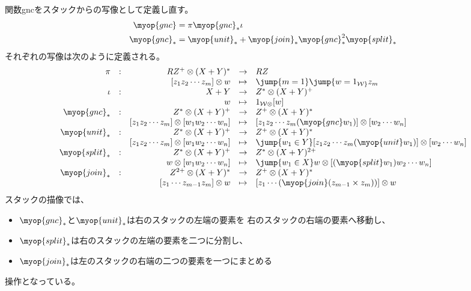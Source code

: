 	関数gncをスタックからの写像として定義し直す。
	\begin{equation}\label{eq:gncのスタックによる表現}\begin{split} %
		\myop{gnc} &= \pi \myop{gnc}_* \iota \\
		\myop{gnc}_* &= \myop{unit}_* 
			+ \myop{join}_*\myop{gnc}_*^2\myop{split}_* \\
	\end{split}\end{equation} %
	それぞれの写像は次のように定義される。
	\begin{equation*}\begin{array}{rcrcl} %
		\pi &:& RZ^+\otimes (X+Y)^* &\to& RZ \\
			&& \word{z_1z_2\cdots z_m}\otimes w &\mapsto&
			\jump{m=1}\jump{w=\wordu}z_m \\
		\iota &:& X+Y &\to& Z^*\otimes (X+Y)^+ \\
			&& w &\mapsto& \wordu\otimes\word{w} \\
		\myop{gnc}_* &:& Z^*\otimes (X+Y)^+ &\to& Z^+\otimes (X+Y)^* \\
			&& \word{z_1z_2\cdots z_m}\otimes\word{w_1w_2\cdots w_n} &\mapsto& 
			\word{z_1z_2\cdots z_m(\myop{gnc}w_1)}\otimes\word{w_2\cdots w_n} \\
		\myop{unit}_* &:& Z^*\otimes (X+Y)^+ &\to& Z^+\otimes (X+Y)^* \\
			&& \word{z_1z_2\cdots z_m}\otimes\word{w_1w_2\cdots w_n} &\mapsto& 
			\jump{w_1\in Y}
			\word{z_1z_2\cdots z_m(\myop{unit}w_1)}\otimes\word{w_2\cdots w_n} \\
		\myop{split}_* &:& Z^*\otimes (X+Y)^+ &\to& Z^*\otimes (X+Y)^{2+} \\
			&& w\otimes\word{w_1w_2\cdots w_n} &\mapsto& 
			\jump{w_1\in X}
			w\otimes\word{(\myop{split}w_1)w_2\cdots w_n} \\
		\myop{join}_* &:& Z^{2+}\otimes (X+Y)^* &\to& Z^+\otimes (X+Y)^* \\
			&& \word{z_1\cdots z_{m-1}z_m}\otimes w &\mapsto& 
			\word{z_1\cdots (\myop{join}(z_{m-1}\times z_m))}\otimes w \\ 
	\end{array}\end{equation*} %
	スタックの描像では、
	\begin{itemize}\setlength{\itemsep}{-1mm} %
		\item $\myop{gnc}_*$と$\myop{unit}_*$は右のスタックの左端の要素を
		右のスタックの右端の要素へ移動し、
		\item $\myop{split}_*$は右のスタックの左端の要素を二つに分割し、
		\item $\myop{join}_*$は左のスタックの右端の二つの要素を一つにまとめる
	\end{itemize} %
	操作となっている。
	
